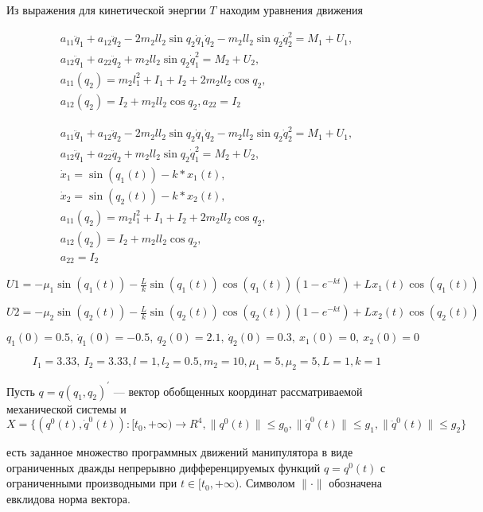 Из выражения для кинетической энергии $T$ находим уравнения движения

\begin{equation}
\begin{array}{l}
a_{11} \ddot q_1 + a_{12} \ddot q_2 - 2 m_2 l l_2 \sin q_2 \dot q_1 \dot q_2 - m_2 l l_2 \sin q_2 \dot q_2^2 = M_1 + U_1,\\ 
a_{12} \ddot q_1 + a_{22} \ddot q_2 + m_2 l l_2 \sin q_2 \dot q_1^2 = M_2 + U_2,\\
a_{11} (q_2) = m_2 l_1^2 + I_1 + I_2 + 2 m_2 l l_2 \cos q_2,\\
a_{12} (q_2)= I_2 + m_2 l l_2 \cos q_2, a_{22} = I_2
\end{array}
\end{equation}

\begin{equation}
\begin{array}{l}
	a_{11} \ddot q_1 + a_{12} \ddot q_2 - 2 m_2 l l_2 \sin q_2 \dot q_1 \dot q_2 - m_2 l l_2 \sin q_2 \dot q_2^2 = M_1 + U_1,\\ 
	a_{12} \ddot q_1 + a_{22} \ddot q_2 + m_2 l l_2 \sin q_2 \dot q_1^2 = M_2 + U_2,\\
	\dot x_1 = \sin(q_1(t)) - k * x_1(t), \\ 
	\dot x_2 = \sin(q_2(t)) - k * x_2(t), \\ 
	a_{11} (q_2) = m_2 l_1^2 + I_1 + I_2 + 2 m_2 l l_2 \cos q_2,\\
	a_{12} (q_2)= I_2 + m_2 l l_2 \cos q_2,\\ 
	a_{22} = I_2
\end{array}
\end{equation}

$U1 = -\mu_1 \sin(q_1(t)) - \frac{L}{k} \sin(q_1(t)) \cos(q_1(t)) (1 - e^{- k t}) + L x_1(t) \cos(q_1(t))$

$U2 = -\mu_2 \sin(q_2(t)) - \frac{L}{k} \sin(q_2(t)) \cos(q_2(t)) (1 - e^{- k t}) + L x_2(t) \cos(q_2(t))$

$q_1(0) = 0.5, \ \dot q_1(0) = -0.5, \ q_2(0) = 2.1, \ \dot q_2(0) = 0.3, \ x_1(0) = 0, \ x_2(0) = 0$

$$ I_1 = 3.33, \ I_2 = 3.33,  l = 1,  l_2 = 0.5,  m_2 = 10, \mu_1 = 5,  \mu_2 = 5, L = 1,  k = 1$$

Пусть $q=q(q_1, q_2)^{'}$ --– вектор обобщенных координат рассматриваемой механической системы и 
$$X = \{(q^0(t), \dot q^0(t)) : [t_0, + \infty) \to R^4, \|q^0(t)\| \le g_0, \|\dot q^0(t) \| \le g_1, \|\ddot q^0(t)\| \le g_2 \}$$

есть заданное множество программных движений манипулятора в виде ограниченных дважды непрерывно дифференцируемых функций $q=q^0(t)$ с ограниченными производными при $t \in [t_0, + \infty).$ Символом $\| \cdot \|$   обозначена евклидова норма вектора.

